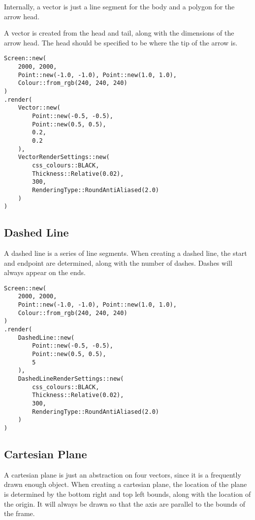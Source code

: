 Internally, a vector is just a line segment for the body and a polygon for the arrow head.

A vector is created from the head and tail, along with the dimensions of the arrow head. The head should be specified to be where the tip of the arrow is.

\begin{lstlisting}
Screen::new(
    2000, 2000,
    Point::new(-1.0, -1.0), Point::new(1.0, 1.0),
    Colour::from_rgb(240, 240, 240)
)
.render(
    Vector::new(
        Point::new(-0.5, -0.5),
        Point::new(0.5, 0.5),
        0.2,
        0.2
    ),
    VectorRenderSettings::new(
        css_colours::BLACK,
        Thickness::Relative(0.02),
        300,
        RenderingType::RoundAntiAliased(2.0)
    )
)
\end{lstlisting}


\subsection{Dashed Line}

A dashed line is a series of line segments. When creating a dashed line, the start and endpoint are determined, along with the number of dashes. Dashes will always appear on the ends.

\begin{lstlisting}
Screen::new(
    2000, 2000,
    Point::new(-1.0, -1.0), Point::new(1.0, 1.0),
    Colour::from_rgb(240, 240, 240)
)
.render(
    DashedLine::new(
        Point::new(-0.5, -0.5),
        Point::new(0.5, 0.5),
        5
    ),
    DashedLineRenderSettings::new(
        css_colours::BLACK,
        Thickness::Relative(0.02),
        300,
        RenderingType::RoundAntiAliased(2.0)
    )
)
\end{lstlisting}


\subsection{Cartesian Plane}

A cartesian plane is just an abstraction on four vectors, since it is a frequently drawn enough object. When creating a cartesian plane, the location of the plane is determined by the bottom right and top left bounds, along with the location of the origin. It will always be drawn so that the axis are parallel to the bounds of the frame.

